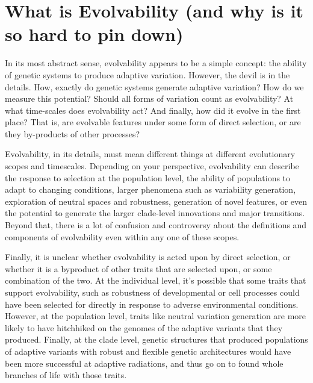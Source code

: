 \documentclass[PhD]{msu-thesis}
\begin{document}
\section{What is Evolvability (and why is it so hard to pin down)}

In its most abstract sense, evolvability appears to be a simple concept: the ability of genetic systems to produce adaptive variation. However, the devil is in the details. How, exactly do genetic systems generate adaptive variation? How do we measure this potential? Should all forms of variation count as evolvability? At what time-scales does evolvability act? And finally, how did it evolve in the first place? That is, are evolvable features under some form of direct selection, or are they by-products of other processes?

Evolvability, in its details, must mean different things at different evolutionary scopes and timescales. 
Depending on your perspective, evolvability can describe the response to selection at the population level\cite{fisher_genetical_1930,houle_comparing_1992}, the ability of populations to adapt to changing conditions\cite{belle_code_2002}, 
larger phenomena such as variability generation\cite{gunter_p._wagner_perspective:_1996}, 
exploration of neutral spaces and robustness\cite{andreas_wagner_robustness_2005,kitano_biological_2004}, 
generation of novel features\cite{alberch_genes_1991,brookfield_evolution:_2001}, 
or even the potential to generate the larger clade-level innovations\cite{kirschner_evolvability_1998} 
and major transitions\cite{smith_major_1995}. 
Beyond that, there is a lot of confusion and controversy about the definitions and components of evolvability even within any one of these scopes\cite{pigliucci_is_2008}.

Finally, it is unclear whether evolvability is acted upon by direct selection, or whether it is a byproduct of other traits that are selected upon, or some combination of the two. At the individual level, it’s possible that some traits that support evolvability, such as robustness of developmental or cell processes\cite{kirschner_evolvability_1998} could have been selected for directly in response to adverse environmental conditions. However, at the population level, traits like neutral variation generation are more likely to have hitchhiked on the genomes of the adaptive variants that they produced. Finally, at the clade level, genetic structures that produced populations of adaptive variants with robust and flexible genetic architectures would have been more successful at adaptive radiations\cite{dawkins_13_2003}, and thus go on to found whole branches of life with those traits\cite{kirschner_evolvability_1998}. 
\end{document}

